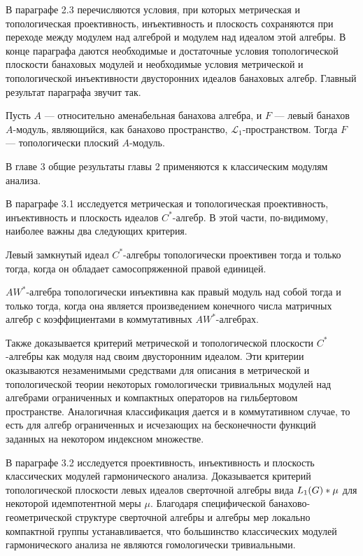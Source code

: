 В параграфе 2.3 перечисляются условия, при которых метрическая и топологическая проективность, инъективность и плоскость сохраняются при переходе между модулем над алгеброй и модулем над идеалом этой алгебры. В конце параграфа даются необходимые и достаточные условия топологической плоскости банаховых модулей и необходимые условия метрической и топологической инъективности двусторонних идеалов банаховых алгебр. Главный результат параграфа звучит так.

\begin{theorem*}[2.3.9] Пусть $A$ --- относительно аменабельная банахова алгебра, и $F$ --- левый банахов $A$-модуль, являющийся, как банахово пространство, $\mathscr{L}_1$-пространством. Тогда $F$ --- топологически плоский $A$-модуль.
\end{theorem*}

В главе 3 общие результаты главы 2 применяются к классическим модулям анализа. 

В параграфе 3.1 исследуется метрическая и топологическая проективность, инъективность и плоскость идеалов $C^*$-алгебр. В этой части, по-видимому, наиболее важны два следующих критерия.

\begin{theorem*}[3.1.4] Левый замкнутый идеал $C^*$-алгебры топологически проективен тогда и только тогда, когда он обладает самосопряженной правой единицей.
\end{theorem*}

\begin{theorem*}[3.1.11] $AW^*$-алгебра топологически инъективна как правый модуль над собой тогда и только тогда, когда она является произведением конечного числа матричных алгебр с коэффициентами в коммутативных $AW^*$-алгебрах.
\end{theorem*}

Также доказывается критерий метрической и топологической плоскости $C^*$-алгебры как модуля над своим двусторонним идеалом. Эти критерии оказываются незаменимыми средствами для описания в метрической и топологической теории некоторых гомологически тривиальных модулей над алгебрами ограниченных и компактных операторов на гильбертовом пространстве. Аналогичная классификация дается и в коммутативном случае, то есть для алгебр ограниченных и исчезающих на бесконечности функций заданных на некотором индексном множестве. 

В параграфе 3.2 исследуется проективность, инъективность и плоскость классических модулей гармонического анализа. Доказывается критерий топологической плоскости левых идеалов сверточной алгебры вида $L_1(G)\ast\mu$ для некоторой идемпотентной меры $\mu$. Благодаря специфической банахово-геометрической структуре сверточной алгебры и алгебры мер локально компактной группы устанавливается, что большинство классических модулей гармонического анализа не являются гомологически тривиальными. 

